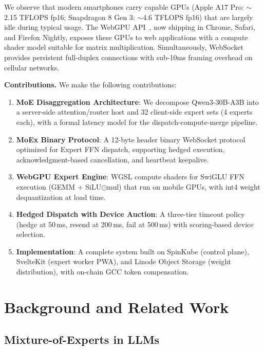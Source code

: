 \documentclass[11pt,a4paper]{article}
\begin{document}
We observe that modern smartphones carry capable GPUs (Apple A17 Pro:
$\sim$2.15 TFLOPS fp16; Snapdragon 8 Gen 3: $\sim$4.6 TFLOPS fp16)
that are largely idle during typical usage. The WebGPU
API~\cite{webgpu2024}, now shipping in Chrome, Safari, and Firefox
Nightly, exposes these GPUs to web applications with a compute shader
model suitable for matrix multiplication. Simultaneously, WebSocket
provides persistent full-duplex connections with sub-10ms framing
overhead on cellular networks.

\textbf{Contributions.} We make the following contributions:

\begin{enumerate}
  \item \textbf{MoE Disaggregation Architecture}: We decompose
    Qwen3-30B-A3B into a server-side attention/router host and 32
    client-side expert sets (4 experts each), with a formal latency
    model for the dispatch-compute-merge pipeline.

  \item \textbf{MoEx Binary Protocol}: A 12-byte header binary
    WebSocket protocol optimized for Expert FFN dispatch, supporting
    hedged execution, acknowledgment-based cancellation, and heartbeat
    keepalive.

  \item \textbf{WebGPU Expert Engine}: WGSL compute shaders for
    SwiGLU FFN execution (GEMM + SiLU$\odot$mul) that run on mobile
    GPUs, with int4 weight dequantization at load time.

  \item \textbf{Hedged Dispatch with Device Auction}: A three-tier
    timeout policy (hedge at 50\,ms, resend at 200\,ms, fail at
    500\,ms) with scoring-based device selection.

  \item \textbf{Implementation}: A complete system built on
    SpinKube (control plane), SvelteKit (expert worker PWA), and
    Linode Object Storage (weight distribution), with on-chain GCC
    token compensation.
\end{enumerate}

\section{Background and Related Work}
\label{sec:related}

\subsection{Mixture-of-Experts in LLMs}
\end{document}
